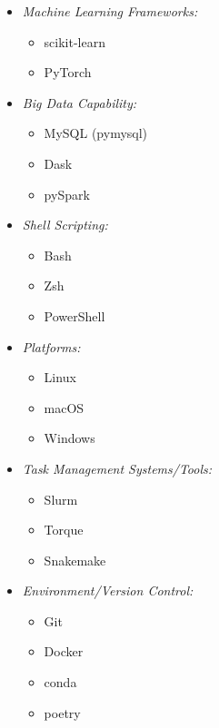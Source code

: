 \begin{multicols}{3}
\begin{itemize}
      
    \item \textit{Machine Learning Frameworks:}  
    \begin{itemize}  
        \item scikit-learn  
        \item PyTorch  
    \end{itemize}  



    \item \textit{Big Data Capability:}  
    \begin{itemize}  
        \item MySQL (pymysql)  
        \item Dask  
        \item pySpark  
    \end{itemize}  
  
    \item \textit{Shell Scripting:}  
    \begin{itemize}  
        \item Bash  
        \item Zsh  
        \item PowerShell  
    \end{itemize}  
  
\end{itemize}  
  
\columnbreak %
  
\begin{itemize}  
    \item \textit{Platforms:}  
    \begin{itemize}  
        \item Linux  
        \item macOS  
        \item Windows  
    \end{itemize} 

    \item \textit{Task Management Systems/Tools:}  
    \begin{itemize}  
        \item Slurm
        \item Torque
        \item Snakemake
    \end{itemize} 

    \item \textit{Environment/Version Control:}  
    \begin{itemize}  
        \item Git
        \item Docker
        \item conda
        \item poetry
    \end{itemize} 


\end{itemize}
\end{multicols}
